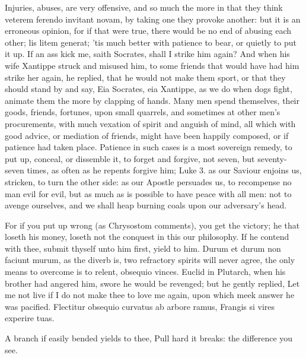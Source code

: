 {Injuries, abuses, are very offensive, and so much the more in that they
think veterem ferendo invitant novam, by taking one they provoke
another: but it is an erroneous opinion, for if that were true, there
would be no end of abusing each other; lis litem generat; 'tis much
better with patience to bear, or quietly to put it up. If an ass kick
me, saith Socrates, shall I strike him again? And when his wife
Xantippe struck and misused him, to some friends that would have had
him strike her again, he replied, that he would not make them sport, or
that they should stand by and say, Eia Socrates, eia Xantippe, as we do
when dogs fight, animate them the more by clapping of hands. Many men
spend themselves, their goods, friends, fortunes, upon small quarrels,
and sometimes at other men's procurements, with much vexation of spirit
and anguish of mind, all which with good advice, or mediation of
friends, might have been happily composed, or if patience had taken
place. Patience in such cases is a most sovereign remedy, to put up,
conceal, or dissemble it, to forget and forgive, not seven,
but seventy-seven times, as often as he repents forgive him; Luke 
3. as our Saviour enjoins us, stricken, to turn the other side: as our
Apostle persuades us, to recompense no man evil for evil, but as
much as is possible to have peace with all men: not to avenge
ourselves, and we shall heap burning coals upon our adversary's head.

For if you put up wrong (as Chrysostom comments), you get the
victory; he that loseth his money, loseth not the conquest in this our
philosophy. If he contend with thee, submit thyself unto him first,
yield to him. Durum et durum non faciunt murum, as the diverb is, two
refractory spirits will never agree, the only means to overcome is to
relent, obsequio vinces. Euclid in Plutarch, when his brother had
angered him, swore he would be revenged; but he gently replied,
Let me not live if I do not make thee to love me again, upon
which meek answer he was pacified.
Flectitur obsequio curvatus ab arbore ramus,
Frangis si vires experire tuas.

A branch if easily bended yields to thee,
Pull hard it breaks: the difference you see.

}
